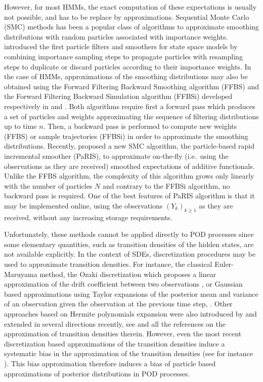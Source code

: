 \documentclass[12pt]{article}
\newcommand{\1}{\mathrm{1}}
\begin{document}
However, for most HMMs, the exact computation of these expectations is usually not possible, and has to be replace by approximations. Sequential Monte Carlo (SMC) methods has been a popular class of algorithms to approximate smoothing distributions with random particles associated with importance weights. 
 \cite{gordon:salmond:smith:1993,kitagawa:1996} introduced the first particle filters and smoothers for state space models by combining importance sampling steps to propagate particles with resampling steps to duplicate or discard particles according to their importance weights.
In the case of HMMs, approximations of the smoothing distributions may also be obtained using the Forward Filtering Backward Smoothing algorithm (FFBS) and  the Forward Filtering Backward Simulation algorithm (FFBSi) developed respectively in \cite{kitagawa:1996,huerzeler:kunsch:1998,doucet:godsill:andrieu:2000} and \cite{godsill:doucet:west:2004}. 
Both algorithms require first a forward pass which produces a set of particles and weights approximating the sequence of filtering distributions up to time $n$. 
Then, a backward pass is performed to compute new weights (FFBS) or sample trajectories (FFBSi) in order to approximate the smoothing distributions. Recently, \cite{olsson:westerborn:2016} proposed a new SMC algorithm, the particle-based rapid incremental smoother (PaRIS), to approximate on-the-fly (i.e.\ using the observations as they are received) smoothed expectations of additive functionals. 
Unlike the FFBS algorithm, the complexity of this algorithm grows only linearly with the number of particles $N$ and contrary to the FFBSi algorithm, no backward pass is required.
 One of the best features of PaRIS algorithm is that it may be implemented online, using the observations $(Y_k)_{k\ge 1}$ as they are received, without any increasing storage requirements.

Unfortunately, these methods cannot be applied directly to POD processes since some elementary quantities, such as transition densities of the hidden states, are not available explicitly.
  In the context of SDEs,  discretization procedures may be used to approximate transition densities.
   For instance, the classical Euler-Maruyama method, the Ozaki discretization which proposes a linear approximation of the drift coefficient between two observations \cite{ozaki:1992,shoji:1998}, or Gaussian based approximations using Taylor expansions of the posterior mean and variance of an observation given the observation at the previous time step, \cite{kessler:1997,kessler:lindner:sorensen:2012,uchida:yoshida:2012}.
   Other approaches based on Hermite polynomials expansion were also introduced by \cite{ait-sahalia:1999,ait-sahalia:2002,ait-sahalia:2008} and extended in several directions recently, see \cite{li:2013} and all the references on the approximation of transition densities therein.
    However, even the most recent discretization based approximations of the transition densities induce a systematic bias in the approximation of the transition densities (see for instance \cite{delmoral:jacod:protter:2001}).
    This bias approximation therefore induces a bias of particle based approximations of posterior distributions in POD processes.
   
\end{document}

